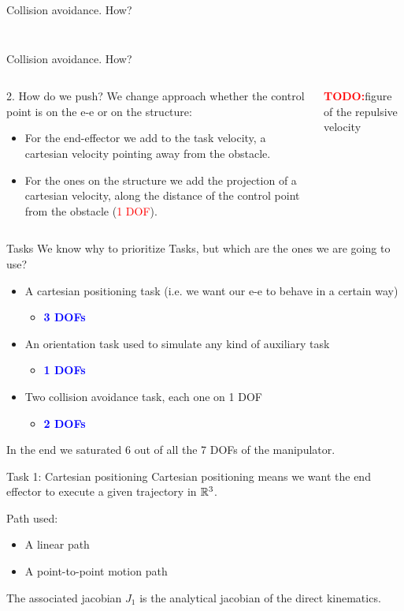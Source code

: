 \documentclass[11pt]{beamer}
\newcommand{\todo}{\textcolor{red}{\textbf{TODO:}}}
\newcommand{\dof}[1]{\begin{itemize}
\item[-]\textcolor{blue}{\textbf{#1 DOFs}}
\end{itemize}}
\begin{document}
\begin{frame}{Collision avoidance. How?}
\begin{columns}
\begin{column}{.5\textwidth}
\begin{figure}[H]
\end{figure}
\end{column}
\end{columns}
\end{frame}

\begin{frame}{Collision avoidance. How?}
	\begin{columns}
		\begin{column}{.5\textwidth}
			\begin{block}{2. How do we push?}
			We change approach whether the control point is on the e-e or on the structure:
				\begin{itemize}
				\item For the end-effector we add to the task velocity, a cartesian velocity pointing away from the obstacle.
				\item For the ones on the structure we add the projection of a cartesian velocity, along the distance of the control point from the obstacle (\textcolor{red}{1 DOF}).
				\end{itemize}
			\end{block}
		\end{column}
		\begin{column}{.5\textwidth}
			\todo figure of the repulsive velocity
		\end{column}
	\end{columns}
\end{frame}

\begin{frame}{Tasks}
We know why to prioritize Tasks, but which are the ones we are going to use?
\begin{itemize}
\item[\textbf{1}] A cartesian positioning task (i.e. we want our e-e to behave in a certain way)
\dof{3}
\item[\textbf{2}] An orientation task used to simulate any kind of auxiliary task
\dof{1}
\item[\textbf{3,4}] Two collision avoidance task, each one on 1 DOF
\dof{2}
\end{itemize}
In the end we saturated 6 out of all the 7 DOFs of the manipulator.
\end{frame}

\begin{frame}{Task 1: Cartesian positioning}
Cartesian positioning means we want the end effector to execute a given trajectory  in $\Bbb R^3$.

\begin{block}{Path used:}
\begin{itemize}
\item A linear path
\item A point-to-point motion path
\end{itemize}
\end{block}

The associated jacobian $J_1$ is the analytical jacobian of the direct kinematics.
\end{frame}
\end{document}
